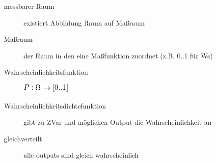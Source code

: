 \documentclass[11pt]{article}
\begin{document}
\begin{description}
\item[messbarer Raum] existiert Abbildung Raum auf Maßraum
\item[Maßraum] der Raum in den eine Maßfunktion zuordnet (z.B. 0..1 für Ws)
\item[Wahrscheinlichkeitsfunktion] \includegraphics[width=.9\linewidth]{201212ad-190439118448i.png}
\item[Wahrscheinlichkeitsdichtefunktion] gibt zu ZVar und möglichen 
      Output die Wahrscheinlichkeit an
\item[gleichverteilt] alle outputs sind gleich wahrscheinlich

\end{description}
\end{document}

